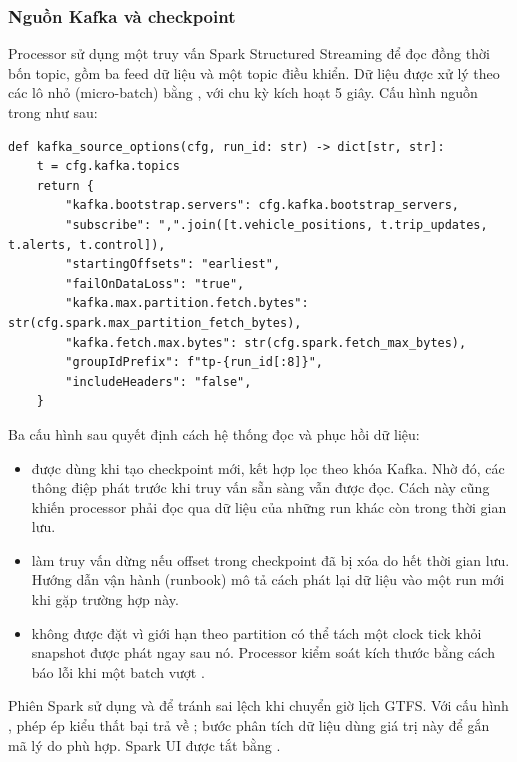 \subsubsection{Nguồn Kafka và checkpoint}

Processor sử dụng một truy vấn Spark Structured Streaming \cite{structured_streaming} để đọc đồng thời bốn topic, gồm ba feed dữ liệu và một topic điều khiển. Dữ liệu được xử lý theo các lô nhỏ (micro-batch) bằng , với chu kỳ kích hoạt 5 giây. Cấu hình nguồn trong  như sau:

\begin{verbatim}
def kafka_source_options(cfg, run_id: str) -> dict[str, str]:
    t = cfg.kafka.topics
    return {
        "kafka.bootstrap.servers": cfg.kafka.bootstrap_servers,
        "subscribe": ",".join([t.vehicle_positions, t.trip_updates, t.alerts, t.control]),
        "startingOffsets": "earliest",
        "failOnDataLoss": "true",
        "kafka.max.partition.fetch.bytes": str(cfg.spark.max_partition_fetch_bytes),
        "kafka.fetch.max.bytes": str(cfg.spark.fetch_max_bytes),
        "groupIdPrefix": f"tp-{run_id[:8]}",
        "includeHeaders": "false",
    }
\end{verbatim}

Ba cấu hình sau quyết định cách hệ thống đọc và phục hồi dữ liệu:
\begin{itemize}
    \item {} được dùng khi tạo checkpoint mới, kết hợp lọc theo khóa Kafka. Nhờ đó, các thông điệp phát trước khi truy vấn sẵn sàng vẫn được đọc. Cách này cũng khiến processor phải đọc qua dữ liệu của những run khác còn trong thời gian lưu.
    \item {} làm truy vấn dừng nếu offset trong checkpoint đã bị xóa do hết thời gian lưu. Hướng dẫn vận hành (runbook) mô tả cách phát lại dữ liệu vào một run mới khi gặp trường hợp này.
    \item {} không được đặt vì giới hạn theo partition có thể tách một clock tick khỏi snapshot được phát ngay sau nó. Processor kiểm soát kích thước bằng cách báo lỗi khi một batch vượt .
\end{itemize}
Phiên Spark sử dụng  và  để tránh sai lệch khi chuyển giờ lịch GTFS. Với cấu hình , phép ép kiểu thất bại trả về ; bước phân tích dữ liệu dùng giá trị này để gắn mã lý do phù hợp. Spark UI được tắt bằng .

